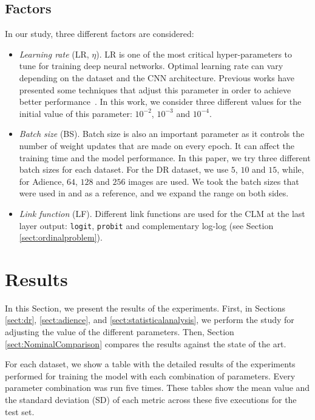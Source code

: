 \documentclass[journal]{IEEEtran}
\begin{document}
	\subsection{Factors}
	In our study, three different factors are considered:
	\begin{itemize}
		\item \textit{Learning rate} (LR, $\eta$). LR is one of the most critical hyper-parameters to tune for training deep neural networks. Optimal learning rate can vary depending on the dataset and the CNN architecture. Previous works have presented some techniques that adjust this parameter in order to achieve better performance~\cite{smith2017cyclical,senior2013empirical}. In this work, we consider three different values for the initial value of this parameter: $10^{-2}$, $10^{-3}$ and $10^{-4}$.
		\item \textit{Batch size} (BS). Batch size is also an important parameter as it controls the number of weight updates that are made on every epoch. It can affect the training time and the model performance. In this paper, we try three different batch sizes for each dataset. For the DR dataset, we use $5$, $10$ and $15$, while, for Adience, $64$, $128$ and $256$ images are used. We took the batch sizes that were used in \cite{de2018weighted} and \cite{beckham2017unimodal} as a reference, and we expand the range on both sides.
		\item \textit{Link function} (LF). Different link functions are used for the CLM at the last layer output: \texttt{logit}, \texttt{probit} and complementary log-log (see Section \ref{sect:ordinalproblem}).
	\end{itemize}
	
	\section{Results}
	\label{sect:results}
	In this Section, we present the results of the experiments. First, in Sections \ref{sect:dr}, \ref{sect:adience}, and \ref{sect:statisticalanalysis}, we perform the study for adjusting the value of the different parameters. Then, Section \ref{sect:NominalComparison} compares the results against the state of the art.
	
	For each dataset, we show a table with the detailed results of the experiments performed for training the model with each combination of parameters. Every parameter combination was run five times. These tables show the mean value and the standard deviation (SD) of each metric across these five executions for the test set.
	
\end{document}
